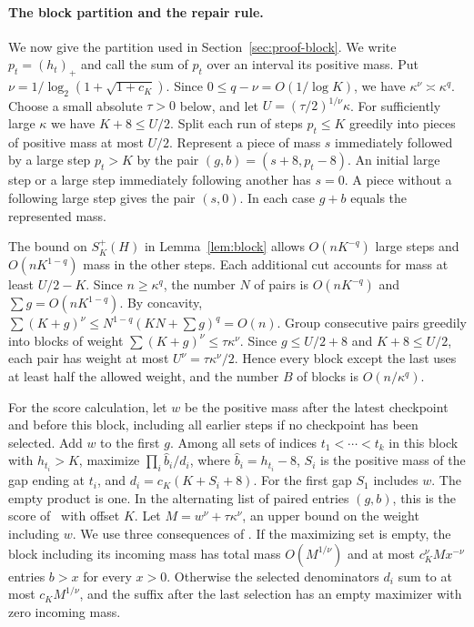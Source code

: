 \documentclass[11pt]{article}
\theoremstyle{definition}
\begin{document}
\paragraph{The block partition and the repair rule.}
We now give the partition used in Section~\ref{sec:proof-block}. We write
\(p_t=(h_t)_+\) and call the sum of \(p_t\) over an interval its positive mass.
Put \(\nu=1/\log_2(1+\sqrt{1+c_K})\). Since
\(0\le q-\nu=O(1/\log K)\), we have \(\kappa^\nu\asymp\kappa^q\).
Choose a small absolute \(\tau>0\) below, and let
\(U=(\tau/2)^{1/\nu}\kappa\). For sufficiently large \(\kappa\) we have
\(K+8\le U/2\). Split each run of steps \(p_t\le K\)
greedily into pieces of positive mass at most \(U/2\). Represent a piece
of mass \(s\) immediately followed by a large step \(p_t>K\) by the pair
\((g,b)=(s+8,p_t-8)\). An initial large step or a large step immediately
following another has \(s=0\). A piece without a following large step
gives the pair \((s,0)\). In each case \(g+b\) equals the represented mass.

The bound on \(S_K^+(H)\) in Lemma~\ref{lem:block} allows \(O(nK^{-q})\) large steps
and \(O(nK^{1-q})\) mass in the other steps. Each additional cut
accounts for mass at least \(U/2-K\). Since \(n\ge\kappa^q\), the
number \(N\) of pairs is \(O(nK^{-q})\) and \(\sum g=O(nK^{1-q})\).
By concavity,
\(\sum(K+g)^\nu\le N^{1-q}(KN+\sum g)^q=O(n)\).
Group consecutive pairs greedily into blocks of weight
\(\sum(K+g)^\nu\le\tau\kappa^\nu\). Since \(g\le U/2+8\) and
\(K+8\le U/2\), each pair has weight at most \(U^\nu=\tau\kappa^\nu/2\).
Hence every block except the last uses at least half the allowed weight,
and the number \(B\) of blocks is \(O(n/\kappa^q)\).

For the score calculation, let \(w\) be the positive mass after the latest
checkpoint and before this block, including all earlier steps if no
checkpoint has been selected. Add \(w\) to the first \(g\). Among all sets
of indices \(t_1<\cdots<t_k\) in this block with \(h_{t_i}>K\), maximize
\(\prod_i \widehat b_i/d_i\), where \(\widehat b_i=h_{t_i}-8\), \(S_i\) is the positive
mass of the gap ending at \(t_i\), and \(d_i=c_K(K+S_i+8)\). For the first
gap \(S_1\) includes \(w\). The empty product is one. In the alternating
list of paired entries \((g,b)\), this is the score of~\cite[Appendix~B]{LY}
with offset \(K\). Let \(M=w^\nu+\tau\kappa^\nu\), an upper
bound on the weight including \(w\). We use three consequences of
\cite[Lemmas~B.5--B.7 and proof of Lemma~4.1(ii)]{LY}. If the maximizing set is empty, the block including its incoming mass has total
mass \(O(M^{1/\nu})\) and at most \(c_K^\nu M x^{-\nu}\) entries
\(b>x\) for every \(x>0\). Otherwise the selected denominators \(d_i\)
sum to at most \(c_K M^{1/\nu}\), and the suffix after the last
selection has an empty maximizer with zero incoming mass.
\end{document}
